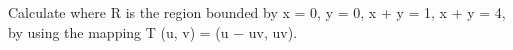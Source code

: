 Calculate where R is the region bounded by x = 0, y = 0, x + y = 1, x + y = 4, by using the mapping T (u, v) = (u − uv, uv).

